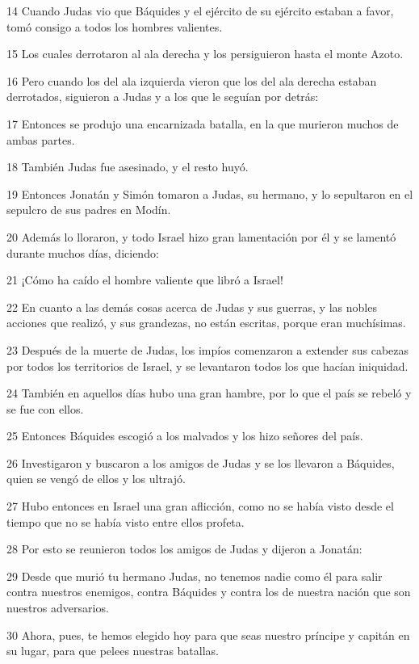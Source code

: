 \par 14 Cuando Judas vio que Báquides y el ejército de su ejército estaban a favor, tomó consigo a todos los hombres valientes.
\par 15 Los cuales derrotaron al ala derecha y los persiguieron hasta el monte Azoto.
\par 16 Pero cuando los del ala izquierda vieron que los del ala derecha estaban derrotados, siguieron a Judas y a los que le seguían por detrás:
\par 17 Entonces se produjo una encarnizada batalla, en la que murieron muchos de ambas partes.
\par 18 También Judas fue asesinado, y el resto huyó.
\par 19 Entonces Jonatán y Simón tomaron a Judas, su hermano, y lo sepultaron en el sepulcro de sus padres en Modín.
\par 20 Además lo lloraron, y todo Israel hizo gran lamentación por él y se lamentó durante muchos días, diciendo:
\par 21 ¡Cómo ha caído el hombre valiente que libró a Israel!
\par 22 En cuanto a las demás cosas acerca de Judas y sus guerras, y las nobles acciones que realizó, y sus grandezas, no están escritas, porque eran muchísimas.
\par 23 Después de la muerte de Judas, los impíos comenzaron a extender sus cabezas por todos los territorios de Israel, y se levantaron todos los que hacían iniquidad.
\par 24 También en aquellos días hubo una gran hambre, por lo que el país se rebeló y se fue con ellos.
\par 25 Entonces Báquides escogió a los malvados y los hizo señores del país.
\par 26 Investigaron y buscaron a los amigos de Judas y se los llevaron a Báquides, quien se vengó de ellos y los ultrajó.
\par 27 Hubo entonces en Israel una gran aflicción, como no se había visto desde el tiempo que no se había visto entre ellos profeta.
\par 28 Por esto se reunieron todos los amigos de Judas y dijeron a Jonatán:
\par 29 Desde que murió tu hermano Judas, no tenemos nadie como él para salir contra nuestros enemigos, contra Báquides y contra los de nuestra nación que son nuestros adversarios.
\par 30 Ahora, pues, te hemos elegido hoy para que seas nuestro príncipe y capitán en su lugar, para que pelees nuestras batallas.
